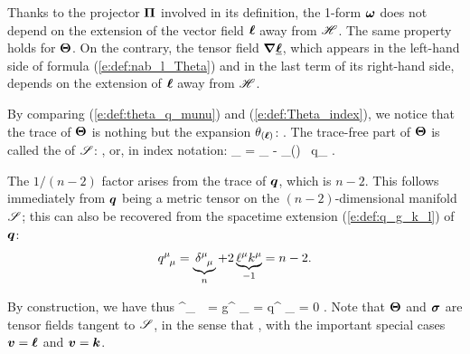 {{\begin{remark}
Thanks to the projector $\bm{\Pi}$ involved in its definition, the 1-form $\bm{\omega}$
does not depend on the extension of the vector field $\bm{\ell}$ away from $\mathscr{H}$.
The same property holds for $\bm{\Theta}$. On the contrary,
the tensor field $\bm{\nabla}\underline{\bm{\ell}}$, which appears
in the left-hand side of formula (\ref{e:def:nab_l_Theta}) and in the last term of its right-hand side, depends on the extension of $\bm{\ell}$ away from $\mathscr{H}$.
\end{remark}

By comparing (\ref{e:def:theta_q_munu}) and (\ref{e:def:Theta_index}), we
notice that the trace of $\bm{\Theta}$ is nothing but the expansion
$\theta_{(\bm{\ell})}$:
\be
   .
\ee
The trace-free part of $\bm{\Theta}$ is called the 
of $\mathscr{S}$:
\be \label{e:def:def_shear}
     ,
\ee
or, in index notation:
\be
    \sigma_{\alpha\beta} = \Theta_{\alpha\beta} -  \theta_{(\wl)} \, q_{\alpha\beta} .
\ee
\begin{remark}
The $1/(n-2)$ factor arises from the trace of $\bm{q}$, which is $n-2$.
This follows immediately from $\bm{q}$ being a metric tensor on the
$(n-2)$-dimensional manifold $\mathscr{S}$; this can also be recovered from the
spacetime extension (\ref{e:def:q_g_k_l}) of $\bm{q}$:
\[
    q^\mu_{\ \, \mu} = \underbrace{\delta^\mu_{\ \, \mu}}_{n}
                    + 2 \underbrace{\ell^\mu k^\mu}_{-1} = n - 2 .
\]
\end{remark}
By construction, we have thus
\be
    \sigma^\mu_{\ \, \mu} = g^{\mu\nu} \sigma_{\mu\nu} = q^{\mu\nu} \sigma_{\mu\nu} = 0 .
\ee
Note that $\bm{\Theta}$ and $\bm{\sigma}$ are tensor fields tangent to $\mathscr{S}$, in the sense
that
\be \label{e:def:Theta_sigma_tangent}
   ,
\ee
with the important special cases $\bm{v} = \bm{\ell}$ and $\bm{v} = \bm{k}$.

}}
